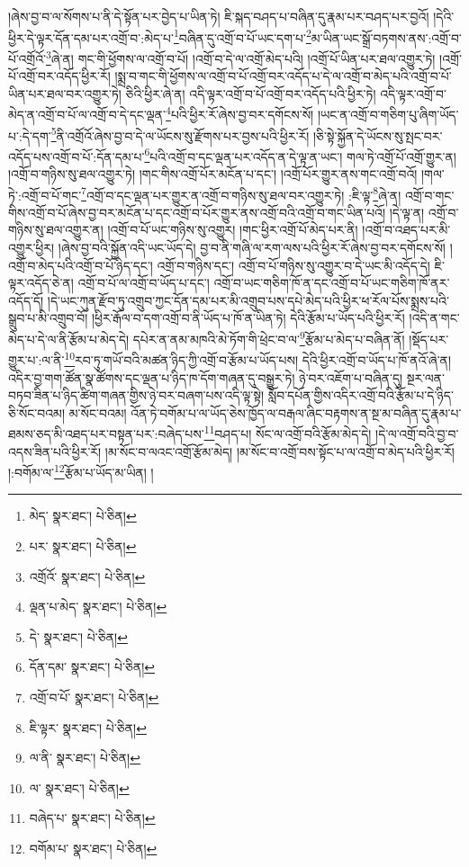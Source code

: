 །ཞེས་བྱ་བ་ལ་སོགས་པ་ནི་དེ་སྟོན་པར་བྱེད་པ་ཡིན་ཏེ། ཇི་སྐད་བཤད་པ་བཞིན་དུ་རྣམ་པར་བཤད་པར་བྱའོ། །དེའི་ཕྱིར་དེ་ལྟར་དོན་དམ་པར་འགྲོ་བ་:མེད་པ་\footnote{མེད་  སྣར་ཐང་།  པེ་ཅིན། }བཞིན་དུ་འགྲོ་བ་པོ་ཡང་དག་པ་\footnote{པར་  སྣར་ཐང་།  པེ་ཅིན། }མ་ཡིན་ཡང་སྒྲོ་བཏགས་ནས་:འགྲོ་བ་པོ་འགྲོའོ་\footnote{འགྲོའོ་  སྣར་ཐང་།  པེ་ཅིན། }ཞེ་ན། གང་གི་ཕྱོགས་ལ་འགྲོ་བ་པོ། །འགྲོ་བ་དེ་ལ་འགྲོ་མེད་པའི། །འགྲོ་པོ་ཡིན་པར་ཐལ་འགྱུར་ཏེ། །འགྲོ་པོ་འགྲོ་བར་འདོད་ཕྱིར་རོ། །སྨྲ་བ་གང་གི་ཕྱོགས་ལ་འགྲོ་བ་པོ་འགྲོ་བར་འདོད་པ་དེ་ལ་འགྲོ་བ་མེད་པའི་འགྲོ་བ་པོ་ཡིན་པར་ཐལ་བར་འགྱུར་ཏེ། ཅིའི་ཕྱིར་ཞེ་ན། འདི་ལྟར་འགྲོ་བ་པོ་འགྲོ་བར་འདོད་པའི་ཕྱིར་ཏེ། འདི་ལྟར་འགྲོ་བ་མེད་ན་འགྲོ་བ་པོ་ལ་འགྲོ་བ་དེ་དང་ལྡན་\footnote{ལྡན་པ་མེད་  སྣར་ཐང་།  པེ་ཅིན། }པའི་ཕྱིར་རོ་ཞེས་བྱ་བར་དགོངས་སོ། །ཡང་ན་འགྲོ་བ་གཅིག་པུ་ཞིག་ཡོད་པ་:དེ་དག་\footnote{དེ་  སྣར་ཐང་།  པེ་ཅིན། }ནི་འགྲོའོ་ཞེས་བྱ་བ་དེ་ལ་ཡོངས་སུ་རྫོགས་པར་བྱས་པའི་ཕྱིར་རོ། །ཅི་སྟེ་སྐྱོན་དེ་ཡོངས་སུ་སྤང་བར་འདོད་པས་འགྲོ་བ་པོ་:དོན་དམ་པ་\footnote{དོན་དམ་  སྣར་ཐང་།  པེ་ཅིན། }པའི་འགྲོ་བ་དང་ལྡན་པར་འདོད་ན་དེ་ལྟ་ན་ཡང་། གལ་ཏེ་འགྲོ་པོ་འགྲོ་གྱུར་ན། །འགྲོ་བ་གཉིས་སུ་ཐལ་འགྱུར་ཏེ། །གང་གིས་འགྲོ་པོར་མངོན་པ་དང་། །འགྲོ་པོར་གྱུར་ནས་གང་འགྲོ་བའོ། །གལ་ཏེ་:འགྲོ་བ་པོ་གང་\footnote{འགྲོ་བ་པོ་  སྣར་ཐང་།  པེ་ཅིན། }འགྲོ་བ་དང་ལྡན་པར་གྱུར་ན་འགྲོ་བ་གཉིས་སུ་ཐལ་བར་འགྱུར་ཏེ། :ཇི་ལྟ་\footnote{ཇི་ལྟར་  སྣར་ཐང་།  པེ་ཅིན། }ཞེ་ན། འགྲོ་བ་གང་གིས་འགྲོ་བ་པོ་ཞེས་བྱ་བར་མངོན་པ་དང་འགྲོ་བ་པོར་གྱུར་ནས་འགྲོ་བའི་འགྲོ་བ་གང་ཡིན་པའོ། །དེ་ལྟ་ན། འགྲོ་བ་གཉིས་སུ་ཐལ་འགྱུར་ན། །འགྲོ་བ་པོ་ཡང་གཉིས་སུ་འགྱུར། །གང་ཕྱིར་འགྲོ་པོ་མེད་པར་ནི། །འགྲོ་བ་འཐད་པར་མི་འགྱུར་ཕྱིར། །ཞེས་བྱ་བའི་སྐྱོན་འདི་ཡང་ཡོད་དེ། བྱ་བ་ནི་གཞི་ལ་རག་ལས་པའི་ཕྱིར་རོ་ཞེས་བྱ་བར་དགོངས་སོ། །འགྲོ་བ་མེད་པའི་འགྲོ་བ་པོ་ཉིད་དང་། འགྲོ་བ་གཉིས་དང་། འགྲོ་བ་པོ་གཉིས་སུ་འགྱུར་བ་དེ་ཡང་མི་འདོད་དེ། ཇི་ལྟར་འདོད་ཅེ་ན། འགྲོ་བ་པོ་ལ་འགྲོ་བ་ཡོད་པ་དང་། འགྲོ་བ་ཡང་གཅིག་ཁོ་ན་དང་འགྲོ་བ་པོ་ཡང་གཅིག་ཁོ་ནར་འདོད་དོ། །དེ་ཡང་ཀུན་རྫོབ་ཏུ་འགྲུབ་ཀྱང་དོན་དམ་པར་མི་འགྲུབ་པས་དཔེ་མེད་པའི་ཕྱིར་ཕ་རོལ་པོས་སྨྲས་པའི་སྒྲུབ་པ་མི་འགྲུབ་བོ། །ཕྱིར་རྒོལ་བ་དག་འགྲོ་བ་ནི་ཡོད་པ་ཁོ་ན་ཡིན་ཏེ། དེའི་རྩོམ་པ་ཡོད་པའི་ཕྱིར་རོ། །འདི་ན་གང་མེད་པ་དེ་ལ་ནི་རྩོམ་པ་མེད་དེ། དཔེར་ན་ནམ་མཁའི་མེ་ཏོག་གི་ཕྲེང་བ་ལ་\footnote{ལ་ནི་  སྣར་ཐང་།  པེ་ཅིན། }རྩོམ་པ་མེད་པ་བཞིན་ནོ། །སྡོད་པར་གྱུར་པ་:ལ་ནི་\footnote{ལ་  སྣར་ཐང་།  པེ་ཅིན། }རབ་ཏུ་གཡོ་བའི་མཚན་ཉིད་ཀྱི་འགྲོ་བ་རྩོམ་པ་ཡོད་པས། དེའི་ཕྱིར་འགྲོ་བ་ཡོད་པ་ཁོ་ནའོ་ཞེ་ན། འདིར་བྱ་གག་ཚོན་སྣ་ཚོགས་དང་ལྡན་པ་ཉིད་ཁ་དོག་གཞན་དུ་བསྒྱུར་ཏེ། ཉེ་བར་འཇོག་པ་བཞིན་དུ། སྔར་ལན་བཏབ་ཟིན་པ་ཉིད་ཚིག་གཞན་གྱིས་ཉེ་བར་བཞག་པས་འདི་ལྟ་སྟེ། སློབ་དཔོན་གྱིས་འདིར་འགྲོ་བའི་རྩོམ་པ་དེ་ཉིད་ཅི་སོང་བའམ། མ་སོང་བའམ། འོན་ཏེ་བགོམ་པ་ལ་ཡོད་ཅེས་ཁྱོད་ལ་བརྒལ་ཞིང་བརྟགས་ན་སྔ་མ་བཞིན་དུ་རྣམ་པ་ཐམས་ཅད་མི་འཐད་པར་བསྟན་པར་:བཞེད་པས་\footnote{བཞེད་པ་  སྣར་ཐང་།  པེ་ཅིན། }བཤད་པ། སོང་ལ་འགྲོ་བའི་རྩོམ་མེད་དེ། །དེ་ལ་འགྲོ་བའི་བྱ་བ་འདས་ཟིན་པའི་ཕྱིར་རོ། །མ་སོང་བ་ལའང་འགྲོ་རྩོམ་མེད། །མ་སོང་བ་འགྲོ་བས་སྟོང་པ་ལ་འགྲོ་བ་མེད་པའི་ཕྱིར་རོ། །:བགོམ་ལ་\footnote{བགོམ་པ་  སྣར་ཐང་།  པེ་ཅིན། }རྩོམ་པ་ཡོད་མ་ཡིན། །
